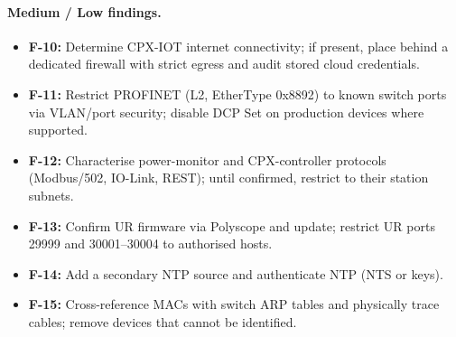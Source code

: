 \documentclass[11pt,a4paper]{article}
\begin{document}
\paragraph{Medium / Low findings.}
\begin{itemize}[nosep]
  \item \textbf{F-10:} Determine CPX-IOT internet connectivity; if present, place behind a dedicated firewall with strict egress and audit stored cloud credentials.
  \item \textbf{F-11:} Restrict PROFINET (L2, EtherType 0x8892) to known switch ports via VLAN/port security; disable DCP Set on production devices where supported.
  \item \textbf{F-12:} Characterise power-monitor and CPX-controller protocols (Modbus/502, IO-Link, REST); until confirmed, restrict to their station subnets.
  \item \textbf{F-13:} Confirm UR firmware via Polyscope and update; restrict UR ports 29999 and 30001--30004 to authorised hosts.
  \item \textbf{F-14:} Add a secondary NTP source and authenticate NTP (NTS or keys).
  \item \textbf{F-15:} Cross-reference MACs with switch ARP tables and physically trace cables; remove devices that cannot be identified.
\end{itemize}
\end{document}
